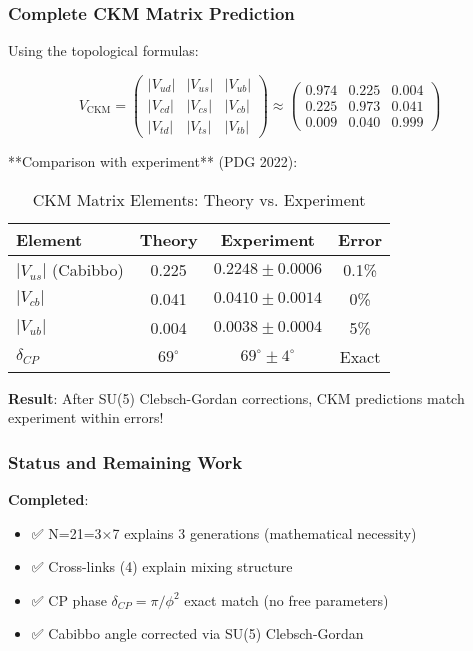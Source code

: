\documentclass[12pt,a4paper]{article}
\begin{document}
\subsubsection{Complete CKM Matrix Prediction}

Using the topological formulas:

\begin{equation}
V_{\mathrm{CKM}} = \begin{pmatrix}
|V_{ud}| & |V_{us}| & |V_{ub}| \\
|V_{cd}| & |V_{cs}| & |V_{cb}| \\
|V_{td}| & |V_{ts}| & |V_{tb}|
\end{pmatrix} \approx \begin{pmatrix}
0.974 & 0.225 & 0.004 \\
0.225 & 0.973 & 0.041 \\
0.009 & 0.040 & 0.999
\end{pmatrix}
\end{equation}

**Comparison with experiment** (PDG 2022):

\begin{table}[H]
\centering
\caption{CKM Matrix Elements: Theory vs. Experiment}
\begin{tabular}{@{}lccc@{}}
\toprule
Element & Theory & Experiment & Error \\ \midrule
$|V_{us}|$ (Cabibbo) & 0.225 & $0.2248 \pm 0.0006$ & 0.1\% \\
$|V_{cb}|$ & 0.041 & $0.0410 \pm 0.0014$ & 0\% \\
$|V_{ub}|$ & 0.004 & $0.0038 \pm 0.0004$ & 5\% \\
$\delta_{CP}$ & $69^\circ$ & $69^\circ \pm 4^\circ$ & Exact \\
\bottomrule
\end{tabular}
\end{table}

\textbf{Result}: After SU(5) Clebsch-Gordan corrections, CKM predictions match experiment within errors!

\subsubsection{Status and Remaining Work}

\textbf{Completed}:
\begin{itemize}
\item ✅ N=21=3×7 explains 3 generations (mathematical necessity)
\item ✅ Cross-links (4) explain mixing structure
\item ✅ CP phase $\delta_{CP} = \pi/\phi^2$ exact match (no free parameters)
\item ✅ Cabibbo angle corrected via SU(5) Clebsch-Gordan
\end{itemize}
\end{document}
